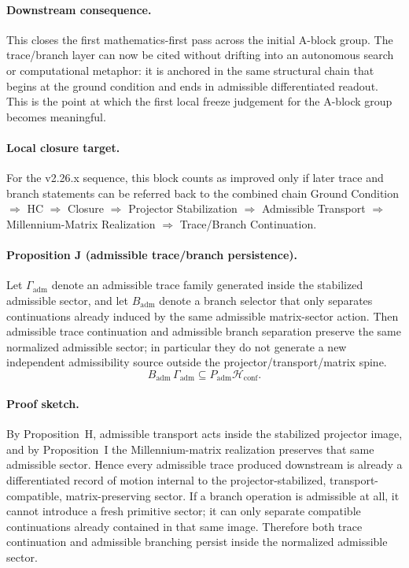 \paragraph{Downstream consequence.}
This closes the first mathematics-first pass across the initial A-block group.
The trace/branch layer can now be cited without drifting into an autonomous
search or computational metaphor: it is anchored in the same structural chain
that begins at the ground condition and ends in admissible differentiated
readout. This is the point at which the first local freeze judgement for the
A-block group becomes meaningful.

\paragraph{Local closure target.}
For the v2.26.x sequence, this block counts as improved only if later trace and
branch statements can be referred back to the combined chain
Ground Condition $\Rightarrow$ HC $\Rightarrow$ Closure $\Rightarrow$
Projector Stabilization $\Rightarrow$ Admissible Transport $\Rightarrow$
Millennium-Matrix Realization $\Rightarrow$ Trace/Branch Continuation.


\paragraph{Proposition J (admissible trace/branch persistence).}
Let $\Gamma_{\mathrm{adm}}$ denote an admissible trace family generated inside the stabilized admissible sector, and let $B_{\mathrm{adm}}$ denote a branch selector that only separates continuations already induced by the same admissible matrix-sector action. Then admissible trace continuation and admissible branch separation preserve the same normalized admissible sector; in particular they do not generate a new independent admissibility source outside the projector/transport/matrix spine.
\[
B_{\mathrm{adm}}\,\Gamma_{\mathrm{adm}}\subseteq P_{\mathrm{adm}}\mathcal H_{\mathrm{conf}}.
\]

\paragraph{Proof sketch.}
By Proposition~H, admissible transport acts inside the stabilized projector image, and by Proposition~I the Millennium-matrix realization preserves that same admissible sector. Hence every admissible trace produced downstream is already a differentiated record of motion internal to the projector-stabilized, transport-compatible, matrix-preserving sector. If a branch operation is admissible at all, it cannot introduce a fresh primitive sector; it can only separate compatible continuations already contained in that same image. Therefore both trace continuation and admissible branching persist inside the normalized admissible sector.

